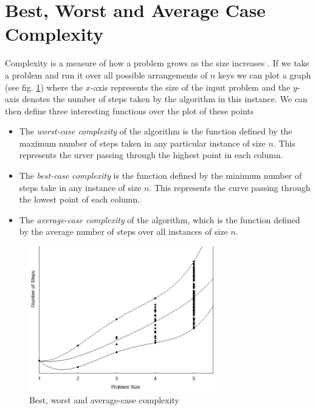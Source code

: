 \section{Best, Worst and Average Case Complexity}
	 Complexity is a measure of how a problem grows as the size increases . If we take a problem and run it over all possible arrangements of $n$ keys we can plot a graph (see fig. \ref{fig:bigOgraph}) where the $x$-axis represents the size of the input problem and the $y$-axis denotes the number of steps taken by the algorithm in this instance. We can then define three interesting functions over the plot of these points	
	\begin{itemize}
		\item The \textit{worst-case complexity}  of the algorithm is the function defined by the maximum number of steps taken in any particular instance of size $n$. This represents the urver passing through the highest point in each column.
		\item The \textit{best-case complexity}  is the function defined by the minimum number of steps take in any instance of size $n$. This represents the curve passing through the lowest point of each column.
		
		\item The \textit{average-case complexity}   of the algorithm, which is the function defined by the average number of steps over all instances of size $n$.
	\end{itemize}
	\begin{figure}[t]
		\centering
		\includegraphics[width=0.75\textwidth]{./assets/imgs/bigOcomplexity.png}
		\caption{\label{fig:bigOgraph} Best, worst and average-case complexity}
	\end{figure}
	

